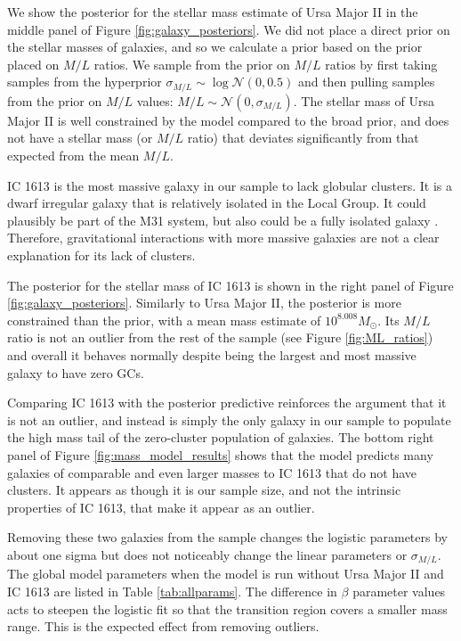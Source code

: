 \documentclass[twocolumn]{aastex631}
\begin{document}
We show the posterior for the stellar mass estimate of Ursa Major II in the middle panel of Figure \ref{fig:galaxy_posteriors}. We did not place a direct prior on the stellar masses of galaxies, and so we calculate a prior based on the prior placed on $M/L$ ratios. We sample from the prior on $M/L$ ratios by first taking samples from the hyperprior $\sigma_{M/L} \sim \log{\mathcal{N}(0,0.5)}$ and then pulling samples from the prior on $M/L$ values: $M/L \sim \mathcal{N}(0, \sigma_{M/L})$. The stellar mass of Ursa Major II is well constrained by the model compared to the broad prior, and does not have a stellar mass (or $M/L$ ratio) that deviates significantly from that expected from the mean $M/L$. 

IC 1613 is the most massive galaxy in our sample to lack globular clusters. It is a dwarf irregular galaxy that is relatively isolated in the Local Group. It could plausibly be part of the M31 system, but also could be a fully isolated galaxy \citep{McConnachie2012}. Therefore, gravitational interactions with more massive galaxies are not a clear explanation for its lack of clusters. 

The posterior for the stellar mass of IC 1613 is shown in the right panel of Figure \ref{fig:galaxy_posteriors}. Similarly to Ursa Major II, the posterior is more constrained than the prior, with a mean mass estimate of $10^{8.008}M_\odot$. Its $M/L$ ratio is not an outlier from the rest of the sample (see Figure \ref{fig:ML_ratios}) and overall it behaves normally despite being the largest and most massive galaxy to have zero GCs.

Comparing IC 1613 with the posterior predictive reinforces the argument that it is not an outlier, and instead is simply the only galaxy in our sample to populate the high mass tail of the zero-cluster population of galaxies. The bottom right panel of Figure \ref{fig:mass_model_results} shows that the model predicts many galaxies of comparable and even larger masses to IC 1613 that do not have clusters. It appears as though it is our sample size, and not the intrinsic properties of IC 1613, that make it appear as an outlier. 

Removing these two galaxies from the sample changes the logistic parameters by about one sigma but does not noticeably change the linear parameters or $\sigma_{M/L}$. The global model parameters when the model is run without Ursa Major II and IC 1613 are listed in Table \ref{tab:allparams}. The difference in $\beta$ parameter values acts to steepen the logistic fit so that the transition region covers a smaller mass range. This is the expected effect from removing outliers.
\end{document}
